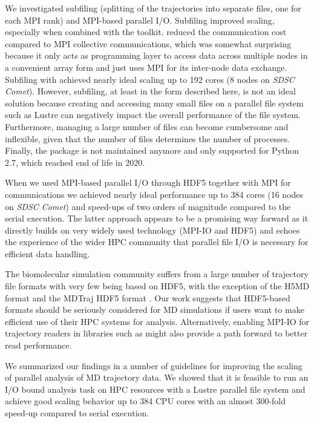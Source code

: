 We investigated subfiling (splitting of the trajectories into separate files, one for each MPI rank) and MPI-based parallel I/O.
Subfiling improved scaling, especially when combined with the  toolkit.
 reduced the communication cost compared to MPI collective communications, which was somewhat surprising because it only acts as programming layer to access data across multiple nodes in a convenient array form and just uses MPI for its inter-node data exchange.
Subfiling with  achieved nearly ideal scaling up to 192 cores (8 nodes on \emph{SDSC Comet}).
However, subfiling, at least in the form described here, is not an ideal solution because creating and accessing many small files on a parallel file system such as Lustre can negatively impact the overall performance of the file system.
Furthermore, managing a large number of files can become cumbersome and inflexible, given that the number of files determines the number of processes.
Finally, the  package is not maintained anymore and only supported for Python 2.7, which reached end of life in 2020.

When we used MPI-based parallel I/O through HDF5 together with MPI for communications we achieved nearly ideal performance up to 384 cores (16 nodes on \emph{SDSC Comet}) and speed-ups of two orders of magnitude compared to the serial execution.
The latter approach appears to be a promising way forward as it directly builds on very widely used technology (MPI-IO and HDF5) and echoes the experience of the wider HPC community that parallel file I/O is necessary for efficient data handling.

The biomolecular simulation community suffers from a large number of trajectory file formats with very few being based on HDF5, with the exception of the H5MD format \cite{Buyl:2014aa} and the MDTraj HDF5 format \cite{McGibbon:2015aa}.
Our work suggests that HDF5-based formats should be seriously considered for MD simulations if users want to make efficient use of their HPC systems for analysis. 
Alternatively, enabling MPI-IO for trajectory readers in libraries such as  might also provide a path forward to better read performance.

We summarized our findings in a number of guidelines for improving the scaling of parallel analysis of MD trajectory data.
We showed that it is feasible to run an I/O bound analysis task on HPC resources with a Lustre parallel file system and achieve good scaling behavior up to 384 CPU cores with an almost 300-fold speed-up compared to serial execution.

